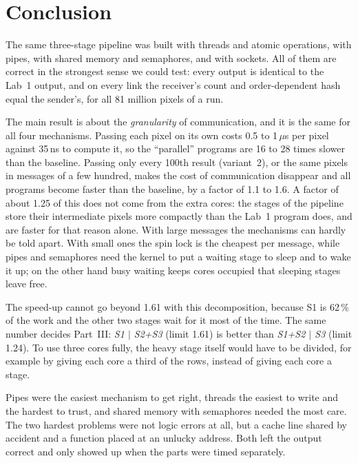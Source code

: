 \documentclass[11pt,a4paper]{article}
\begin{document}
\section{Conclusion}

The same three-stage pipeline was built with threads and atomic operations, with pipes, with shared
memory and semaphores, and with sockets. All of them are correct in the strongest sense we could
test: every output is identical to the Lab~1 output, and on every link the receiver's count and
order-dependent hash equal the sender's, for all 81 million pixels of a run.

The main result is about the \emph{granularity} of communication, and it is the same for all four
mechanisms. Passing each pixel on its own costs 0.5 to 1\,$\mu$s per pixel against 35\,ns to compute
it, so the ``parallel'' programs are 16 to 28 times slower than the baseline. Passing only every
100th result (variant~2), or the same pixels in messages of a few hundred, makes the cost of
communication disappear and all programs become faster than the baseline, by a factor of 1.1 to
1.6. A factor of about 1.25 of this does not come from the extra cores: the stages of the pipeline
store their intermediate pixels more compactly than the Lab~1 program does, and are faster for
that reason alone. With large messages the mechanisms can hardly be told apart. With small ones the spin lock is
the cheapest per message, while pipes and semaphores need the kernel to put a waiting stage to sleep
and to wake it up; on the other hand busy waiting keeps cores occupied that sleeping stages leave
free.

The speed-up cannot go beyond 1.61 with this decomposition, because S1 is 62\,\% of the work and
the other two stages wait for it most of the time. The same number decides Part~III: \emph{S1
$\vert$ S2+S3} (limit 1.61) is better than \emph{S1+S2 $\vert$ S3} (limit 1.24). To use three cores
fully, the heavy stage itself would have to be divided, for example by giving each core a third of
the rows, instead of giving each core a stage.

Pipes were the easiest mechanism to get right, threads the easiest to write and the hardest to
trust, and shared memory with semaphores needed the most care. The two hardest problems were not
logic errors at all, but a cache line shared by accident and a function placed at an unlucky
address. Both left the output correct and only showed up when the parts were timed separately.
\end{document}

